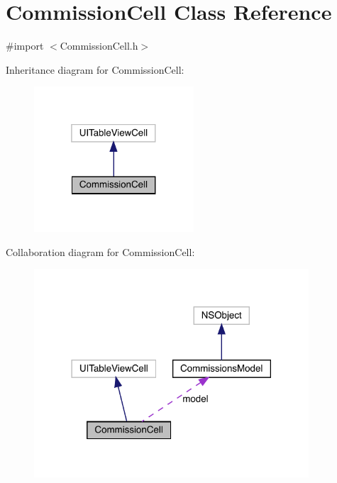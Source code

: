 \hypertarget{interface_commission_cell}{}\section{Commission\+Cell Class Reference}
\label{interface_commission_cell}


{\ttfamily \#import $<$Commission\+Cell.\+h$>$}



Inheritance diagram for Commission\+Cell\+:\nopagebreak
\begin{figure}[H]
\begin{center}
\leavevmode
\includegraphics[width=169pt]{interface_commission_cell__inherit__graph}
\end{center}
\end{figure}


Collaboration diagram for Commission\+Cell\+:\nopagebreak
\begin{figure}[H]
\begin{center}
\leavevmode
\includegraphics[width=290pt]{interface_commission_cell__coll__graph}
\end{center}
\end{figure}
